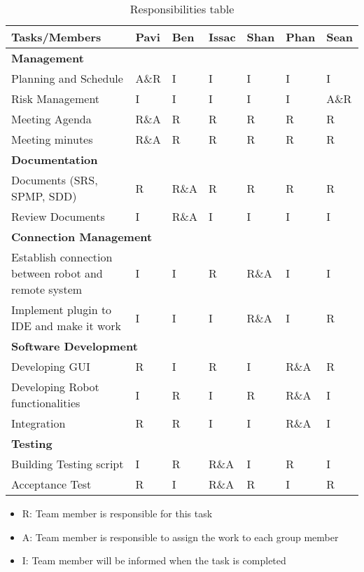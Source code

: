 \begin{table}[]
	\centering
	\caption{Responsibilities table}
	\label{my-label}
	\begin{tabular}{|l|l|l|l|l|l|l|}
		\hline
		Tasks/Members                                        & Pavi & Ben  & Issac & Shan & Phan & Sean \\ \hline
		\multicolumn{7}{|l|}{\textbf{Management}}                                                       \\ \hline
		Planning and Schedule                                & A\&R & I    & I     & I    & I    & I    \\ \hline
		Risk Management                                      & I    & I    & I     & I    & I    & A\&R \\ \hline
		Meeting Agenda                                       & R\&A & R    & R     & R    & R    & R    \\ \hline
		Meeting minutes                                      & R\&A & R    & R     & R    & R    & R    \\ \hline
		\multicolumn{7}{|l|}{\textbf{Documentation}}                                                    \\ \hline
		Documents (SRS, SPMP, SDD)                           & R    & R\&A & R     & R    & R    & R    \\ \hline
		Review Documents                                     & I    & R\&A & I     & I    & I    & I    \\ \hline
		\multicolumn{7}{|l|}{\textbf{Connection Management}}                                            \\ \hline
		Establish connection between robot and remote system & I    & I    & R     & R\&A & I    & I    \\ \hline
		Implement plugin to IDE and make it work             & I    & I    & I     & R\&A & I    & R    \\ \hline
		\multicolumn{7}{|l|}{\textbf{Software Development}}                                             \\ \hline
		Developing GUI                                       & R    & I    & R     & I    & R\&A & R    \\ \hline
		Developing Robot functionalities                     & I    & R    & I     & R    & R\&A & I    \\ \hline
		Integration                                          & R    & R    & I     & I    & R\&A & I    \\ \hline
		\multicolumn{7}{|l|}{\textbf{Testing}}                                                          \\ \hline
		Building Testing script                              & I    & R    & R\&A  & I    & R    & I    \\ \hline
		Acceptance Test                                      & R    & I    & R\&A  & R    & I    & R    \\ \hline
	\end{tabular}
\end{table}
\begin{itemize}
\item R: Team member is responsible for this task
\item A: Team member is responsible to assign the work to each group member
\item I: Team member will be informed when the task is completed
\end{itemize}